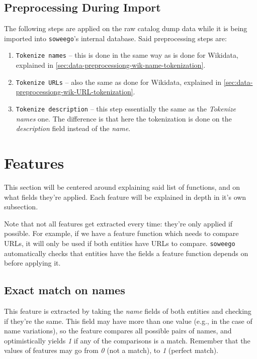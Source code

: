 \documentclass[epsfig,a4paper,11pt,titlepage,twoside,openany]{book}
\newcommand{\soweego}[0]{\texttt{soweego}\xspace}
\begin{document}
\subsection{Preprocessing During Import}
\label{sec:data-preprocessing-import}

The following steps are applied on the raw catalog dump data while it is being imported into \soweego's internal database. Said preprocessing steps are:

\begin{enumerate}
    \item \texttt{Tokenize names} -- this is done in the same way as is done for Wikidata, explained in \autoref{sec:data-preprocessiong-wik-name-tokenization}.
    
    \item \texttt{Tokenize URLs} -- also the same as done for Wikidata, explained in \autoref{sec:data-preprocessiong-wik-URL-tokenization}.
    
    \item \texttt{Tokenize description} -- this step essentially the same as the \textit{Tokenize names} one. The difference is that here the tokenization is done on the \textit{description} field instead of the \textit{name}.
\end{enumerate}




\section{Features}
\label{sec:used-features}

This section will be centered around explaining said list of functions, and on what fields they're applied. Each feature will be explained in depth in it's own subsection.

Note that not all features get extracted every time: they're only applied if possible. For example, if we have a feature function which needs to compare URLs, it will only be used if both entities have URLs to compare. \texttt{soweego} automatically checks that entities have the fields a feature function depends on before applying it.


\subsection{Exact match on names}
\label{sec:feature-exact-match-names}

This feature is extracted by taking the \textit{name} fields of both entities and checking if they're the same. This field may have more than one value (e.g., in the case of name variations), so the feature compares all possible pairs of names, and optimistically yields \textit{1} if any of the comparisons is a match. Remember that the values of features may go from \textit{0} (not a match), to \textit{1} (perfect match). 
\end{document}
